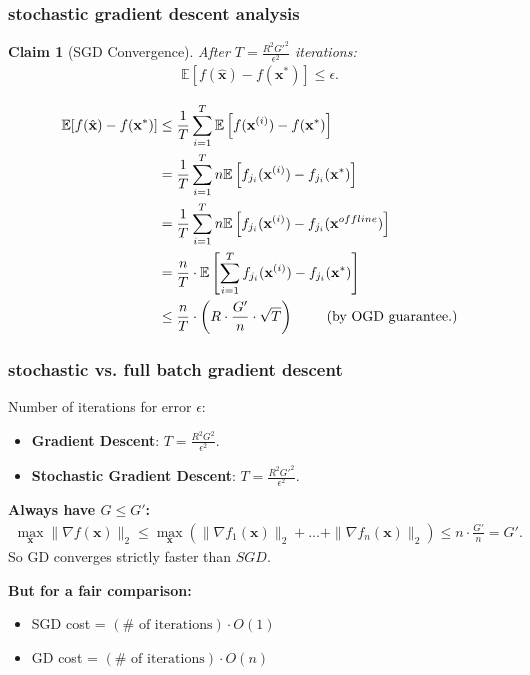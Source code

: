 \documentclass[compress]{beamer}
\newcommand{\bv}[1]{\mathbf{#1}}
\newcommand{\E}{\mathbb{E}}
\newtheorem{claim}[theorem]{Claim}
\begin{document}
\begin{frame}[t]
	\frametitle{stochastic gradient descent analysis}
	\small
	\begin{claim}[SGD Convergence]
		After $T = \frac{R^2G'^2}{\epsilon^2}$ iterations:
		\vspace{-1em}
		\begin{align*}
			\E\left[f(\hat{\bv{x}}) - f(\bv{x}^*)\right] \leq \epsilon.
		\end{align*}
	
		\vspace{-1em}
	\end{claim}\vspace{-2em}
	\begin{align*}
		\E[f(\hat{\bv{x}}) - f(\bv{x}^*)] &\leq \frac{1}{T}\sum_{i=1}^T\E\left[f(\bv{x}^{(i)}) -f(\bv{x}^*)\right]
		\\
		&=\frac{1}{T}\sum_{i=1}^Tn\E\left[f_{j_i}(\bv{x}^{(i)}) -f_{j_i}(\bv{x}^*)\right]\\
				&=\frac{1}{T}\sum_{i=1}^Tn\E\left[f_{j_i}(\bv{x}^{(i)}) -f_{j_i}(\bv{x}^{offline})\right]\\
		& = \frac{n}{T}\cdot \E\left[\sum_{i=1}^T f_{j_i}(\bv{x}^{(i)}) -f_{j_i}(\bv{x}^*)\right]\\
		& \leq \frac{n}{T} \cdot\left(R\cdot\frac{G'}{n}\cdot \sqrt{T}\right) \text{\hspace{2em} (by OGD guarantee.)}
	\end{align*}
\end{frame}


\begin{frame}[t]
	\frametitle{stochastic vs. full batch gradient descent}
	Number of iterations for error $\epsilon$:
	\begin{itemize}
		\item \textbf{Gradient Descent}: $T = \frac{R^2 G^2}{\epsilon^2}$. 
		\item \textbf{Stochastic Gradient Descent}: $T = \frac{R^2 G'^2}{\epsilon^2}$. 
	\end{itemize}
	
	\textbf{Always have $G \leq G'$:}
	\begin{align*}
		\max_{\bv{x}} \|\nabla f(\bv{x})\|_2 \leq\max_{\bv{x}}\left( \|\nabla f_1(\bv{x})\|_2 + \ldots + \|\nabla f_n(\bv{x})\|_2\right) \leq n\cdot\frac{G'}{n} = G'.
	\end{align*}
So GD converges strictly faster than $SGD$. 
	
	\textbf{But for a fair comparison:}
	\begin{itemize}
		\item SGD cost = $(\# \text{ of iterations})\cdot O(1)$
		\item GD cost = $(\# \text{ of iterations})\cdot O(n)$
	\end{itemize}
\end{frame}
\end{document}
